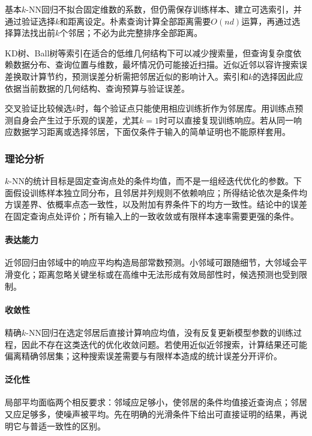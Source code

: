 基本$k$-NN回归不拟合固定维数的系数，但仍需保存训练样本、建立可选索引，并通过验证选择$k$和距离设定。朴素查询计算全部距离需要$O(nd)$运算，再通过选择算法找出前$k$个邻居；不必为此完整排序全部距离。

KD树、Ball树等索引在适合的低维几何结构下可以减少搜索量，但查询复杂度依赖数据分布、查询位置与维数，最坏情况仍可能接近扫描。近似近邻以容许搜索误差换取计算节约，预测误差分析需把邻居近似的影响计入。索引和$k$的选择因此应依据当前数据的几何结构、查询预算与验证误差。

交叉验证比较候选$k$时，每个验证点只能使用相应训练折作为邻居库。用训练点预测自身会产生过于乐观的误差，尤其$k=1$时可以直接复现训练响应。若从同一响应数据学习距离或选择邻居，下面仅条件于输入的简单证明也不能原样套用。

\subsubsection{理论分析}
\label{sec:regression-knn-theory}

$k$-NN的统计目标是固定查询点处的条件均值，而不是一组经迭代优化的参数。下面假设训练样本独立同分布，且邻居并列规则不依赖响应；所得结论依次是条件均方误差界、依概率点态一致性，以及附加有界条件下的均方一致性。结论中的误差在固定查询点处评价；所有输入上的一致收敛或有限样本速率需要更强的条件。

\paragraph{表达能力}
近邻回归由邻域中的响应平均构造局部常数预测。小邻域可跟随细节，大邻域会平滑变化；距离忽略关键坐标或在高维中无法形成有效局部性时，候选预测也受到限制。

\paragraph{收敛性}
精确$k$-NN回归在选定邻居后直接计算响应均值，没有反复更新模型参数的训练过程，因此不存在这类迭代的优化收敛问题。若使用近似近邻搜索，计算结果还可能偏离精确邻居集；这种搜索误差需要与有限样本造成的统计误差分开评价。

\paragraph{泛化性}
局部平均面临两个相反要求：邻域应足够小，使邻居的条件均值接近查询点；邻居又应足够多，使噪声被平均。先在明确的光滑条件下给出可直接证明的结果，再说明它与普适一致性的区别。


